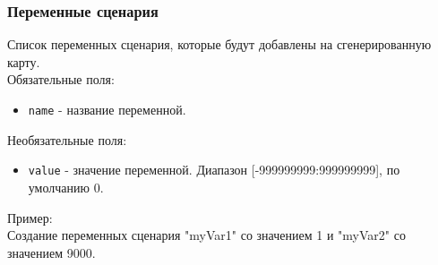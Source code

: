 \subsubsection{Переменные сценария}
\label{scenarioVariables}
Список переменных сценария, которые будут добавлены на сгенерированную карту.\\

Обязательные поля:
\begin{itemize}
\item \texttt{name} - название переменной.
\end{itemize}

Необязательные поля:
\begin{itemize}
\item \texttt{value} - значение переменной. Диапазон [-999999999:999999999], по умолчанию 0.
\end{itemize}

Пример:\\
Создание переменных сценария "myVar1" со значением 1 и "myVar2" со значением 9000.

\begin{figure}[H]

\end{figure}